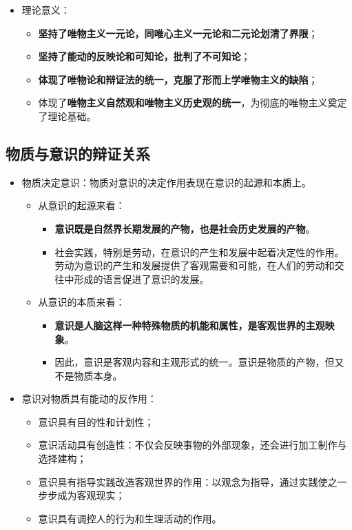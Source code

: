 \documentclass[12pt,openany]{ctexbook}
\begin{document}
\begin{itemize}
\begin{itemize}
  \item 物质运动与时间和空间的不可分割性，证明了时间和空间的客观性。
  \item 具体物质形态的时空是有限的，而整个物质世界的时空是无限的。
  \par 物质、运动、时间、空间具有内在统一性，要求我们想问题、办事情都要以具体的时间、地点和条件为转移
\end{itemize}
  \item 理论意义：
\begin{itemize}
  \item \textbf{坚持了唯物主义一元论，同唯心主义一元论和二元论划清了界限}；
  \item \textbf{坚持了能动的反映论和可知论，批判了不可知论}；
  \item \textbf{体现了唯物论和辩证法的统一，克服了形而上学唯物主义的缺陷}；
  \item 体现了\textbf{唯物主义自然观和唯物主义历史观的统一}，为彻底的唯物主义奠定了理论基础。
\end{itemize}
\end{itemize}
\subsection{物质与意识的辩证关系}
\begin{itemize}
  \item 物质决定意识：物质对意识的决定作用表现在意识的起源和本质上。
\begin{itemize}
  \item 从意识的起源来看：
\begin{itemize}
  \item \textbf{意识既是自然界长期发展的产物，也是社会历史发展的产物}。
  \item 社会实践，特别是劳动，在意识的产生和发展中起着决定性的作用。劳动为意识的产生和发展提供了客观需要和可能，在人们的劳动和交往中形成的语言促进了意识的发展。
\end{itemize}
  \item 从意识的本质来看：
\begin{itemize}
  \item \textbf{意识是人脑这样一种特殊物质的机能和属性，是客观世界的主观映象}。
  \item 因此，意识是客观内容和主观形式的统一。意识是物质的产物，但又不是物质本身。
\end{itemize}
\end{itemize}
  \item 意识对物质具有能动的反作用：
\begin{itemize}
  \item 意识具有目的性和计划性；
  \item 意识活动具有创造性：不仅会反映事物的外部现象，还会进行加工制作与选择建构；
  \item 意识具有指导实践改造客观世界的作用：以观念为指导，通过实践使之一步步成为客观现实；
  \item 意识具有调控人的行为和生理活动的作用。
\end{itemize}
\end{itemize}
\end{document}
